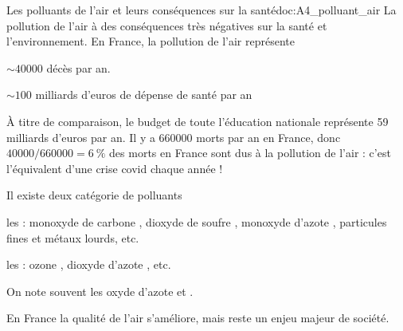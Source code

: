 \begin{doc}{Les polluants de l'air et leurs conséquences sur la santé}{doc:A4_polluant_air}
  La pollution de l'air à des conséquences très négatives sur la santé et l'environnement.
  En France, la pollution de l'air représente
  \begin{listePoints}
    \item $\sim \num{40000}$ décès par an.
    \item $\sim 100$ milliards d'euros de dépense de santé par an 
  \end{listePoints}
  À titre de comparaison, le budget de toute l'éducation nationale représente 59 milliards d'euros par an. 
  Il y a \num{660 000} morts par an en France, donc $\num{40000}/\num{660000} = \qty{6}{\percent}$ des morts en France sont dus à la pollution de l'air : c'est l'équivalent d'une crise covid chaque année !

  \begin{importants}
    Il existe deux catégorie de polluants
    \begin{listePoints}
      \item les  : monoxyde de carbone , dioxyde de soufre , monoxyde d'azote , particules fines et métaux lourds, etc.
      \item les  : ozone , dioxyde d'azote , etc.
    \end{listePoints}
    On note souvent  les oxyde d'azote  et .
  \end{importants}
  
  En France la qualité de l'air s'améliore, mais reste un enjeu majeur de société.

  \begin{center}
  \end{center}
\end{doc}


